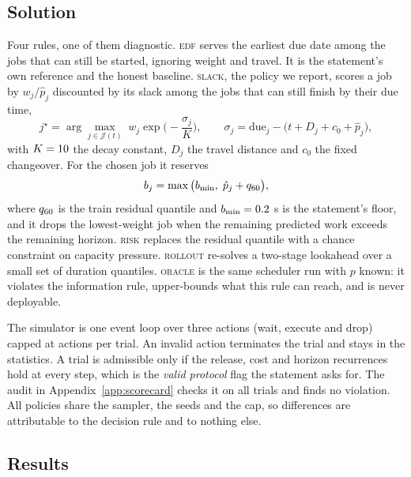 \documentclass{swmcmthesis}
\begin{document}
\subsection{Solution}
\label{sec:p3sol}

Four rules, one of them diagnostic. \textsc{edf} serves the earliest due date among
the jobs that can still be started, ignoring weight and travel. It is the
statement's own reference and the honest baseline. \textsc{slack}, the policy we
report, scores a job by $w_j/\hat p_j$ discounted by its slack among the jobs that can
still finish by their due time,
\begin{equation}
j^{\star}=\arg\max_{j\in\mathcal{J}(t)}\; w_j\exp\!\Big(-\frac{\sigma_j}{K}\Big),
\qquad
\sigma_j=\mathrm{due}_j-\big(t+D_j+c_0+\hat p_j\big),
\label{eq:slackscore}
\end{equation}
with $K=10$ the decay constant, $D_j$ the travel distance and $c_0$ the
fixed changeover. For the chosen job it reserves
\begin{equation}
b_j=\max\big(b_{\min},\;\hat p_j+q_{60}\big),
\label{eq:reserve}
\end{equation}
where $q_{60}$ is the train residual quantile and $b_{\min}=0.2$ s is
the statement's floor, and it drops the lowest-weight job when the remaining predicted
work exceeds the remaining horizon. \textsc{risk} replaces the residual quantile with a chance
constraint on capacity pressure. \textsc{rollout} re-solves a two-stage lookahead
over a small set of duration quantiles. \textsc{oracle} is the same scheduler run
with $p$ known: it violates the information rule, upper-bounds what this rule can reach, and is never
deployable.

The simulator is one event loop over three actions (wait, execute and drop) capped at \slotMaxActions{} actions per trial. An invalid action terminates the trial
and stays in the statistics. A trial is admissible only if the release, cost and
horizon recurrences hold at every step, which is the \emph{valid protocol} flag the
statement asks for. The audit in Appendix~\ref{app:scorecard} checks it on all
\slotPOfficialTrials{} trials and finds no violation. All policies share the sampler, the seeds and the cap,
so differences are attributable to the decision rule and to nothing else.

\subsection{Results}
\label{sec:p3res}
\end{document}
